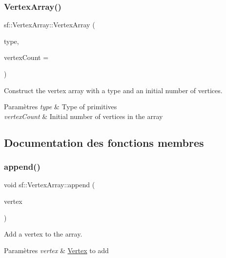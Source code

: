 \subsubsection{\texorpdfstring{Vertex\+Array()}{VertexArray()}\hspace{0.1cm}{\footnotesize\ttfamily [2/2]}}
{\footnotesize\ttfamily sf\+::\+Vertex\+Array\+::\+Vertex\+Array (\begin{DoxyParamCaption}\item[{\hyperlink{group__graphics_ga5ee56ac1339984909610713096283b1b}{Primitive\+Type}}]{type,  }\item[{std\+::size\+\_\+t}]{vertex\+Count = {} }\end{DoxyParamCaption})\hspace{0.3cm}{\ttfamily [explicit]}}



Construct the vertex array with a type and an initial number of vertices. 


\begin{DoxyParams}{Paramètres}
{\em type} & Type of primitives \\
\hline
{\em vertex\+Count} & Initial number of vertices in the array \\
\hline
\end{DoxyParams}


\subsection{Documentation des fonctions membres}
\mbox{\label{classsf_1_1VertexArray_a80c8f6865e53bd21fc6cb10fffa10035}} 
\subsubsection{\texorpdfstring{append()}{append()}}
{\footnotesize\ttfamily void sf\+::\+Vertex\+Array\+::append (\begin{DoxyParamCaption}\item[{const \hyperlink{classsf_1_1Vertex}{Vertex} \&}]{vertex }\end{DoxyParamCaption})}



Add a vertex to the array. 


\begin{DoxyParams}{Paramètres}
{\em vertex} & \hyperlink{classsf_1_1Vertex}{Vertex} to add \\
\hline
\end{DoxyParams}
\mbox{\label{classsf_1_1VertexArray_a3654c424aca1f9e468f369bc777c839c}} 
